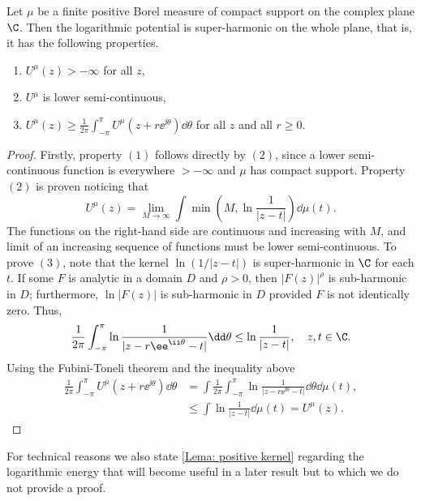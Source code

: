 \begin{proposicao} \cite{saff2024logarithmic}
	Let $\mu$ be a finite positive Borel measure of compact support on the complex plane $\C$. Then the logarithmic potential is super-harmonic on the whole plane, that is, it has the following properties.
	\begin{enumerate}
		\item $U^{\mu}(z) > -\infty$ for all $z$,
		\item $U^{\mu}$ is lower semi-continuous,
		\item $U^{\mu}(z) \geq \frac{1}{2\pi} \int_{-\pi}^{\pi} U^{\mu}(z + r \ee^{\ii \theta}) \dd \theta$ for all $z$ and all $r \geq 0$. 
	\end{enumerate}
\end{proposicao}
\begin{proof}
	Firstly, property $(1)$ follows directly by $(2)$, since a lower semi-continuous function is everywhere $> -\infty$ and $\mu$ has compact support. Property $(2)$ is proven noticing that
	\begin{equation}
		U^\mu(z) = \lim_{M \rightarrow \infty} \int \min\left( M, \ln \frac{1}{|z - t|} \right) \dd \mu (t).
	\end{equation}
	The functions on the right-hand side are continuous and increasing with $M$, and limit of an increasing sequence of functions must be lower semi-continuous. To prove $(3)$, note that the kernel $\ln(1/|z-t|)$ is super-harmonic in $\C$ for each $t$. If some $F$ is analytic in a domain $D$ and $\rho > 0$, then $|F(z)|^\rho$ is sub-harmonic in $D$; furthermore, $\ln |F(z)|$ is sub-harmonic in $D$ provided $F$ is not identically zero. Thus, 
	\begin{equation}
		\frac{1}{2\pi} \int_{-\pi}^{\pi} \ln{\frac{1}{|z - r\ee^{\ii \theta} - t|}} \dd \theta \leq \ln \frac{1}{|z-t|}, \quad z, t \in \C.
	\end{equation}
	Using the Fubini-Toneli theorem and the inequality above
	\begin{align}
		\frac{1}{2\pi} \int_{-\pi}^{\pi} U^\mu (z + r \ee^{\ii \theta}) \dd \theta & = \int \frac{1}{2\pi} \int_{-\pi}^{\pi} \ln{\frac{1}{|z - r\ee^{\ii \theta} - t|}} \dd \theta \dd \mu(t), \\
		& \leq \int \ln \frac{1}{|z-t|} \dd \mu(t) = U^\mu (z).
	\end{align}
\end{proof}

For technical reasons we also state \autoref{Lema: positive kernel} regarding the logarithmic energy that will become useful in a later result but to which we do not provide a proof.


